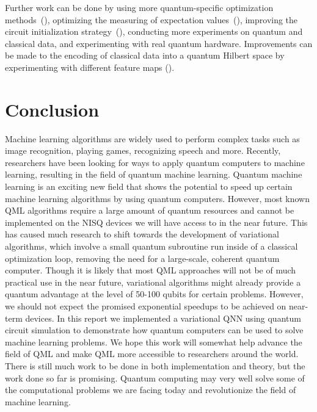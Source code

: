 \documentclass[a4paper,10pt]{article}
\begin{document}
Further work can be done by using more quantum-specific optimization methods~(\cite{stokes2019quantum}), optimizing the measuring of expectation values~(\cite{sweke2019stochastic}), improving the circuit initialization strategy~(\cite{mcclean2018barren}), conducting more experiments on quantum and classical data, and experimenting with real quantum hardware.
Improvements can be made to the encoding of classical data into a quantum Hilbert space by experimenting with different feature maps (\cite{schuld2019quantum}).

\section{Conclusion} \label{sec:conclusion}
Machine learning algorithms are widely used to perform complex tasks such as image recognition, playing games, recognizing speech and more.
Recently, researchers have been looking for ways to apply quantum computers to machine learning, resulting in the field of quantum machine learning.
Quantum machine learning is an exciting new field that shows the potential to speed up certain machine learning algorithms by using quantum computers.
However, most known QML algorithms require a large amount of quantum resources and cannot be implemented on the NISQ devices we will have access to in the near future.
This has caused much research to shift towards the development of variational algorithms, which involve a small quantum subroutine run inside of a classical optimization loop, removing the need for a large-scale, coherent quantum computer. 
Though it is likely that most QML approaches will not be of much practical use in the near future, variational algorithms might already provide a quantum advantage at the level of 50-100 qubits for certain problems.
However, we should not expect the promised exponential speedups to be achieved on near-term devices.
In this report we implemented a variational QNN using quantum circuit simulation to demonstrate how quantum computers can be used to solve machine learning problems.
We hope this work will somewhat help advance the field of QML and make QML more accessible to researchers around the world.
There is still much work to be done in both implementation and theory, but the work done so far is promising.
Quantum computing may very well solve some of the computational problems we are facing today and revolutionize the field of machine learning.

\clearpage

\printbibliography[heading=bibintoc]
\end{document}
